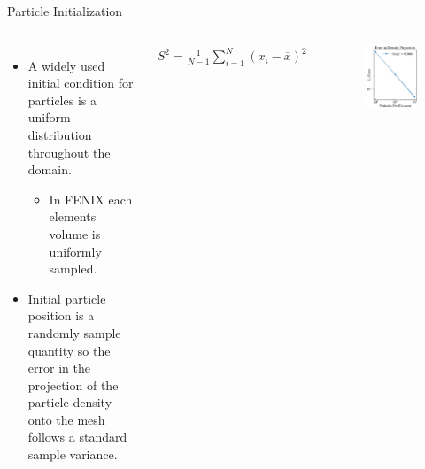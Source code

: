 \documentclass[aspectratio=169, 16pt]{beamer}
\begin{document}
\begin{frame}{Particle Initialization}
  \vspace{1cm}
  \begin{columns}
      \begin{itemize}
        \item A widely used initial condition for particles is a uniform distribution throughout the domain.
        \begin{itemize}
          \item In FENIX each elements volume is uniformly sampled.
        \end{itemize}
      \item Initial particle position is a randomly sample quantity so the error in the projection of the particle density onto the mesh follows a standard sample variance.
      \end{itemize}
      \begin{align}
        S^2 = 
        \frac{ 1 }{ N - 1 }
        \sum_{i=1}^N 
        \left( x_i - \overline{x} \right)^2
      \end{align}
      \centering 
      \begin{figure}
        \centering 
        \includegraphics[height=0.7\textheight]{figs/density_error.png}
      \end{figure}
  \end{columns}
  
\end{frame}
\end{document}
